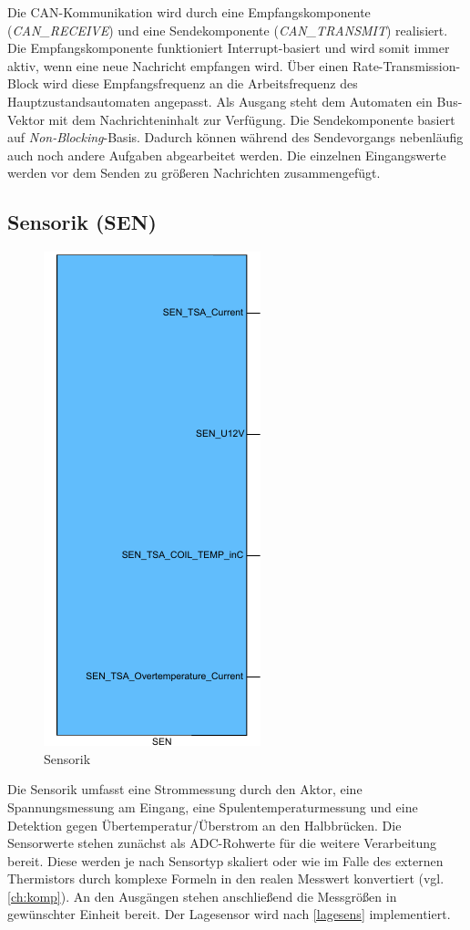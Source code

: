 Die CAN-Kommunikation wird durch eine Empfangskomponente (\textit{CAN\_RECEIVE}) und eine Sendekomponente (\textit{CAN\_TRANSMIT}) realisiert. Die Empfangskomponente funktioniert Interrupt-basiert und wird somit immer aktiv, wenn eine neue Nachricht empfangen wird. Über einen Rate-Transmission-Block wird diese Empfangsfrequenz an die Arbeitsfrequenz des Hauptzustandsautomaten angepasst. Als Ausgang steht dem Automaten ein Bus-Vektor mit dem Nachrichteninhalt zur Verfügung. 
Die Sendekomponente basiert auf \textit{Non-Blocking}-Basis. Dadurch können während des Sendevorgangs nebenläufig auch noch andere Aufgaben abgearbeitet werden. Die einzelnen Eingangswerte werden vor dem Senden zu größeren Nachrichten zusammengefügt.

\subsection{Sensorik (SEN)}\label{SEN}
\begin{figure}[H]%
\centering
\includegraphics[width=0.2\columnwidth]{./Bilder/fig_sen}%
\caption{Sensorik}%
\label{fig_sen}%
\end{figure}
Die Sensorik umfasst eine Strommessung durch den Aktor, eine Spannungsmessung am Eingang, eine Spulentemperaturmessung und eine Detektion gegen Übertemperatur/Überstrom an den Halbbrücken. Die Sensorwerte stehen zunächst als ADC-Rohwerte für die weitere Verarbeitung bereit. Diese werden je nach Sensortyp skaliert oder wie im Falle des externen Thermistors durch komplexe Formeln in den realen Messwert konvertiert (vgl. \autoref{ch:komp}). An den Ausgängen stehen anschließend die Messgrößen in gewünschter Einheit bereit. Der Lagesensor wird nach \autoref{lagesens} implementiert.

